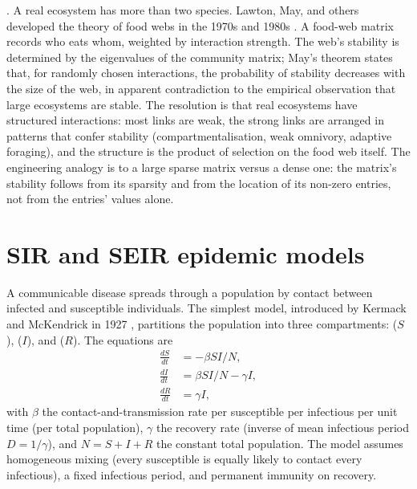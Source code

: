 . A real ecosystem has more than
two species. Lawton, May, and others developed the theory of food
webs in the 1970s and 1980s
\cite[chs.~6--7]{text:v6c08-may-stability}. A food-web matrix records who
eats whom, weighted by interaction strength. The web's stability is
determined by the eigenvalues of the community matrix; May's theorem
states that, for randomly chosen interactions, the probability of
stability decreases with the size of the web, in apparent
contradiction to the empirical observation that large ecosystems
are stable. The resolution is that real ecosystems have structured
interactions: most links are weak, the strong links are arranged
in patterns that confer stability (compartmentalisation, weak omnivory,
adaptive foraging), and the structure is the product of selection
on the food web itself. The engineering analogy is to a large
sparse matrix versus a dense one: the matrix's stability follows
from its sparsity and from the location of its non-zero entries,
not from the entries' values alone.

\section{SIR and SEIR epidemic models}

A communicable disease spreads through a population by contact
between infected and susceptible individuals. The simplest model,
introduced by Kermack and McKendrick in 1927
\cite[pp.~700--721]{paper:v6c08-kermack-mckendrick-1927}, partitions the
population into three compartments:  ($S$),
 ($I$), and  ($R$). The
equations are
\begin{align*}
\frac{dS}{dt} &= -\beta S I / N, \\
\frac{dI}{dt} &= \beta S I / N - \gamma I, \\
\frac{dR}{dt} &= \gamma I,
\end{align*}
with $\beta$ the contact-and-transmission rate per susceptible per
infectious per unit time (per total population), $\gamma$ the
recovery rate (inverse of mean infectious period $D = 1/\gamma$), and
$N = S + I + R$ the constant total population. The model assumes
homogeneous mixing (every susceptible is equally likely to contact
every infectious), a fixed infectious period, and permanent immunity
on recovery.



